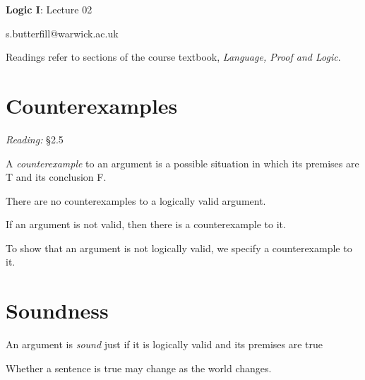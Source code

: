 \documentclass[12pt]{extarticle}
\date{}
\makeatletter
\def \ititle {Origins of Mind}
\def \isubtitle {Lecture 08}
\def \iemail{s.butterfill@warwick.ac.uk}
\makeatother
\begin{document}
\raggedcolumns

\begin{multicols*}{3}

\setlength\footnotesep{1em}









\def \ititle {Logic I}
 
\def \isubtitle {Lecture 02}
 
\begin{center}
 
{\Large
 
\textbf{\ititle}: \isubtitle
 
}
 
 
 
\iemail %
 
\end{center}
 
Readings refer to sections of the course textbook, \emph{Language, Proof and Logic}.
 
 
 
\section{Counterexamples}
 
\emph{Reading:} §2.5
 
A \emph{counterexample} to an argument is a possible situation in which its premises are T and its conclusion F.
 
There are no counterexamples to a logically valid argument.
 
If an argument is not valid, then there is a counterexample to it.
 
To show that an argument is not logically valid, we specify a counterexample to it.
 
 
 
\section{Soundness}
 
An argument is \emph{sound} just if it is logically valid and its premises are true
 
Whether a sentence is true may change as the world changes.
 

\end{multicols*}
\end{document}

